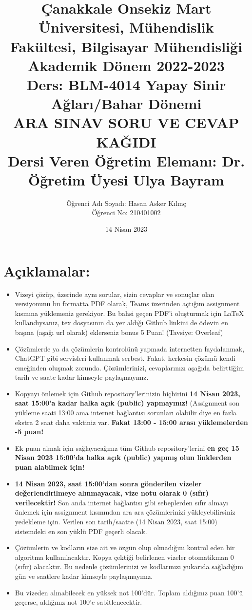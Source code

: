 \documentclass[11pt]{article}
\title{Çanakkale Onsekiz Mart Üniversitesi, Mühendislik Fakültesi, Bilgisayar Mühendisliği Akademik Dönem 2022-2023\\
Ders: BLM-4014 Yapay Sinir Ağları/Bahar Dönemi\\ 
ARA SINAV SORU VE CEVAP KAĞIDI\\
Dersi Veren Öğretim Elemanı: Dr. Öğretim Üyesi Ulya Bayram}
\author{%
\begin{minipage}{\textwidth}
\raggedright
Öğrenci Adı Soyadı: Hasan Asker Kılınç\\ %
Öğrenci No: 210401002
\end{minipage}%
}
\date{14 Nisan 2023}
\begin{document}
\maketitle

\vspace{-.5in}
\section*{Açıklamalar:}
\begin{itemize}
    \item Vizeyi çözüp, üzerinde aynı sorular, sizin cevaplar ve sonuçlar olan versiyonunu bu formatta PDF olarak, Teams üzerinden açtığım assignment kısmına yüklemeniz gerekiyor. Bu bahsi geçen PDF'i oluşturmak için LaTeX kullandıysanız, tex dosyasının da yer aldığı Github linkini de ödevin en başına (aşağı url olarak) eklerseniz bonus 5 Puan! (Tavsiye: Overleaf)
    \item Çözümlerde ya da çözümlerin kontrolünü yapmada internetten faydalanmak, ChatGPT gibi servisleri kullanmak serbest. Fakat, herkesin çözümü kendi emeğinden oluşmak zorunda. Çözümlerinizi, cevaplarınızı aşağıda belirttiğim tarih ve saate kadar kimseyle paylaşmayınız. 
    \item Kopyayı önlemek için Github repository'lerinizin hiçbirini \textbf{14 Nisan 2023, saat 15:00'a kadar halka açık (public) yapmayınız!} (Assignment son yükleme saati 13:00 ama internet bağlantısı sorunları olabilir diye en fazla ekstra 2 saat daha vaktiniz var. \textbf{Fakat 13:00 - 15:00 arası yüklemelerden -5 puan!}
    \item Ek puan almak için sağlayacağınız tüm Github repository'lerini \textbf{en geç 15 Nisan 2023 15:00'da halka açık (public) yapmış olun linklerden puan alabilmek için!}
    \item \textbf{14 Nisan 2023, saat 15:00'dan sonra gönderilen vizeler değerlendirilmeye alınmayacak, vize notu olarak 0 (sıfır) verilecektir!} Son anda internet bağlantısı gibi sebeplerden sıfır almayı önlemek için assignment kısmından ara ara çözümlerinizi yükleyebilirsiniz yedekleme için. Verilen son tarih/saatte (14 Nisan 2023, saat 15:00) sistemdeki en son yüklü PDF geçerli olacak.
    \item Çözümlerin ve kodların size ait ve özgün olup olmadığını kontrol eden bir algoritma kullanılacaktır. Kopya çektiği belirlenen vizeler otomatikman 0 (sıfır) alacaktır. Bu nedenle çözümlerinizi ve kodlarınızı yukarıda sağladığım gün ve saatlere kadar kimseyle paylaşmayınız.
    \item Bu vizeden alınabilecek en yüksek not 100'dür. Toplam aldığınız puan 100'ü geçerse, aldığınız not 100'e sabitlenecektir.

\end{itemize}
\end{document}
